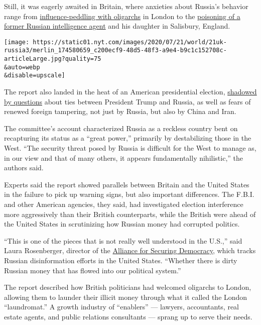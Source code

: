 Still, it was eagerly awaited in Britain, where anxieties about Russia's
behavior range from
\href{https://www.nytimes.com/2018/05/21/world/europe/uk-russia-money-laundering-london.html}{influence-peddling
with oligarchs} in London to the
\href{https://www.nytimes.com/2018/09/09/world/europe/sergei-skripal-russian-spy-poisoning.html}{poisoning
of a former Russian intelligence agent} and his daughter in Salisbury,
England.

\texttt{[image: https://static01.nyt.com/images/2020/07/21/world/21uk-russia3/merlin\_174580659\_c200ecf9-48d5-48f3-a9e4-b9c1c152708c-articleLarge.jpg?quality=75\\\&auto=webp\\\&disable=upscale]}

The report also landed in the heat of an American presidential election,
\href{https://www.nytimes.com/2020/02/20/us/politics/russian-interference-trump-democrats.html}{shadowed
by questions} about ties between President Trump and Russia, as well as
fears of renewed foreign tampering, not just by Russia, but also by
China and Iran.

The committee's account characterized Russia as a reckless country bent
on recapturing its status as a ``great power,'' primarily by
destabilizing those in the West. ``The security threat posed by Russia
is difficult for the West to manage as, in our view and that of many
others, it appears fundamentally nihilistic,'' the authors said.

Experts said the report showed parallels between Britain and the United
States in the failure to pick up warning signs, but also important
differences. The F.B.I. and other American agencies, they said, had
investigated election interference more aggressively than their British
counterparts, while the British were ahead of the United States in
scrutinizing how Russian money had corrupted politics.

``This is one of the pieces that is not really well understood in the
U.S.,'' said Laura Rosenberger, director of the
\href{https://securingdemocracy.gmfus.org/}{Alliance for Securing
Democracy}, which tracks Russian disinformation efforts in the United
States. ``Whether there is dirty Russian money that has flowed into our
political system.''

The report described how British politicians had welcomed oligarchs to
London, allowing them to launder their illicit money through what it
called the London ``laundromat.'' A growth industry of ``enablers'' ---
lawyers, accountants, real estate agents, and public relations
consultants --- sprang up to serve their needs.

